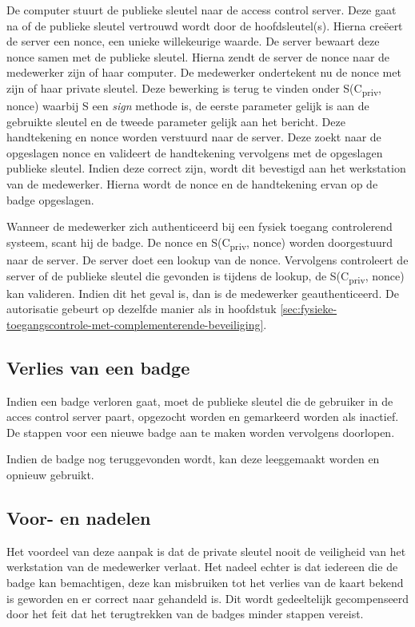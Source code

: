 De computer stuurt de publieke sleutel naar de access control server. Deze gaat
na of de publieke sleutel vertrouwd wordt door de hoofdsleutel(s). Hierna
creëert de server een nonce, een unieke willekeurige waarde. De server bewaart
deze nonce samen met de publieke sleutel. Hierna zendt de server de nonce naar
de medewerker zijn of haar computer. De medewerker ondertekent nu de nonce met
zijn of haar private sleutel. Deze bewerking is terug te vinden onder
S(C\textsubscript{priv}, nonce) waarbij S een \textit{sign} methode is, de
eerste parameter gelijk is aan de gebruikte sleutel en de tweede parameter
gelijk aan het bericht. Deze handtekening en nonce worden verstuurd naar de
server. Deze zoekt naar de opgeslagen nonce en valideert de handtekening
vervolgens met de opgeslagen publieke sleutel. Indien deze correct zijn, wordt
dit bevestigd aan het werkstation van de medewerker. Hierna wordt de nonce en de
handtekening ervan op de badge opgeslagen.

Wanneer de medewerker zich authenticeerd bij een fysiek toegang controlerend
systeem, scant hij de badge. De nonce en S(C\textsubscript{priv}, nonce) worden
doorgestuurd naar de server. De server doet een lookup van de nonce. Vervolgens
controleert de server of de publieke sleutel die gevonden is tijdens de lookup,
de S(C\textsubscript{priv}, nonce) kan valideren. Indien dit het geval is, dan
is de medewerker geauthenticeerd. De autorisatie gebeurt op dezelfde manier als
in hoofdstuk
\ref{sec:fysieke-toegangscontrole-met-complementerende-beveiliging}.

\subsection{Verlies van een badge}

Indien een badge verloren gaat, moet de publieke sleutel die de gebruiker in de
acces control server paart, opgezocht worden en gemarkeerd worden als inactief.
De stappen voor een nieuwe badge aan te maken worden vervolgens doorlopen.

Indien de badge nog teruggevonden wordt, kan deze leeggemaakt worden en opnieuw
gebruikt.

\subsection{Voor- en nadelen}
Het voordeel van deze aanpak is dat de private sleutel nooit de veiligheid van
het werkstation van de medewerker verlaat. Het nadeel echter is dat iedereen die
de badge kan bemachtigen, deze kan misbruiken tot het verlies van de kaart
bekend is geworden en er correct naar gehandeld is. Dit wordt gedeeltelijk
gecompenseerd door het feit dat het terugtrekken van de badges minder stappen
vereist.

